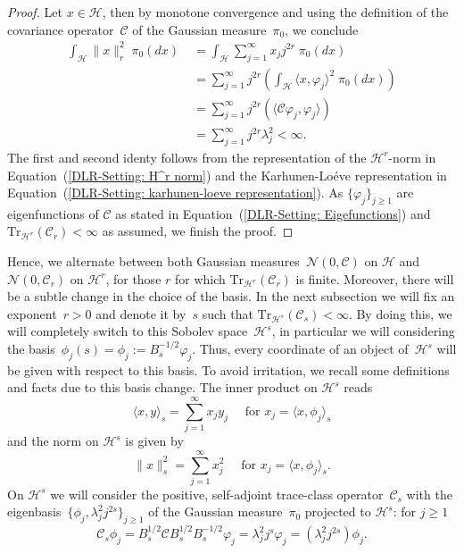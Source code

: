 \begin{proof}
 Let $x \in \mathcal{H}$, then by monotone convergence and using the definition of the covariance operator~$\mathcal{C}$ of the Gaussian measure~$\pi_0$, we conclude
 \begin{align*}
  \int_{\mathcal{H}} \| x \|_r^2 \; \pi_0 (dx) & \; = \int_{\mathcal{H}} \sum_{j=1}^{\infty} x_j j^{2r} \; \pi_0 (dx)  \\
  & \; = \sum_{j=1}^{\infty} j^{2r} ( \int_{\mathcal{H}}  \langle x, \varphi_j \rangle^2  \; \pi_0 (dx) )  \\
  & \; = \sum_{j=1}^{\infty} j^{2r} (   \langle \mathcal{C} \varphi_j, \varphi_j \rangle   )    \\
  & \; = \sum_{j=1}^{\infty} j^{2r} \lambda_j^2 < \infty.
 \end{align*}
 The first and second identy follows from the representation of the $\mathcal{H}^r$-norm in Equation~(\ref{DLR-Setting: H^r norm}) and the Karhunen-Lo\'{e}ve representation in Equation~(\ref{DLR-Setting: karhunen-loeve representation}). As $\{  \varphi_j \}_{j \geq 1}$ are eigenfunctions of $\mathcal{C}$ as stated in Equation~(\ref{DLR-Setting: Eigefunctions}) and $\text{Tr}_{\mathcal{H}^r}(\mathcal{C}_r) < \infty$ as assumed, we finish the proof.

\end{proof}

Hence, we alternate between both Gaussian measures~$\mathcal{N}(0, \mathcal{C})$ on $\mathcal{H}$ and $\mathcal{N}(0, \mathcal{C}_r)$ on $\mathcal{H}^r$, for those $r$ for which $\text{Tr}_{\mathcal{H}^r}(\mathcal{C}_r)$ is finite. Moreover, there will be a subtle change in the choice of the basis. In the next subsection we will fix an exponent~$r>0$ and denote it by~$s$ such that $\text{Tr}_{\mathcal{H}^s}(\mathcal{C}_s) < \infty$. By doing this, we will completely switch to this Sobolev space~$\mathcal{H}^s$, in particular we will considering the basis~$\phi_j(s) = \phi_j := B^{-1/2}_s \varphi_j$. Thus, every coordinate of an object of~$\mathcal{H}^s$ will be given with respect to this basis. To avoid irritation, we recall some definitions and facts due to this basis change. The inner product on $\mathcal{H}^s$ reads
\begin{equation}
  \langle x, y \rangle_s = \sum_{j=1}^{\infty} x_j y_j \quad \text{ for } x_j = \langle x, \phi_j\rangle_s
\end{equation}
and the norm on $\mathcal{H}^s$ is given by
\begin{equation}
  \| x \|_s^2 = \sum_{j=1}^{\infty} x_j^2 \quad \text{ for } x_j = \langle x, \phi_j\rangle_s.
\end{equation}
On $\mathcal{H}^s$ we will consider the positive, self-adjoint trace-class operator~$\mathcal{C}_s$ with the eigenbasis~$\{ \phi_j,  \lambda_j^2 j^{2s} \}_{j \geq 1}$ of the Gaussian measure~$\pi_0$ projected to $\mathcal{H}^s$: for $j \geq 1$
\begin{equation}
\label{DLR-Setting: Definition Eigefunctions of C_s}
   \mathcal{C}_s \phi_j = B_s^{1/2} \mathcal{C}B^{1/2}_sB^{-1/2}_s \varphi_j  =  \lambda_j^2 j^s \varphi_j = ( \lambda_j^2 j^{2s}) \phi_j.
\end{equation}

